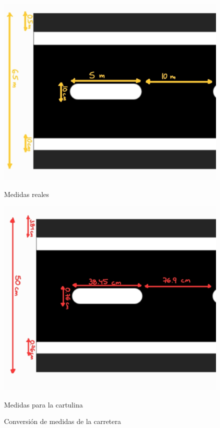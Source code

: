 \begin{figure}[ht!]
	\centering
	\begin{minipage}{0.45\linewidth}
		\centering
		\includegraphics[width=\linewidth]{figs/cap6/medidas_reales.jpg}
		\caption*{\centering Medidas reales} 
	\end{minipage}
	\hspace{1 cm}
	\begin{minipage}{0.45\linewidth}
		\centering
		\includegraphics[width=\linewidth]{figs/cap6/medidas_ficticias.jpg}
		\caption*{\centering Medidas para la cartulina}
	\end{minipage}
	\caption{Conversión de medidas de la carretera}
	\label{fig:medidascarretera}
\end{figure}

